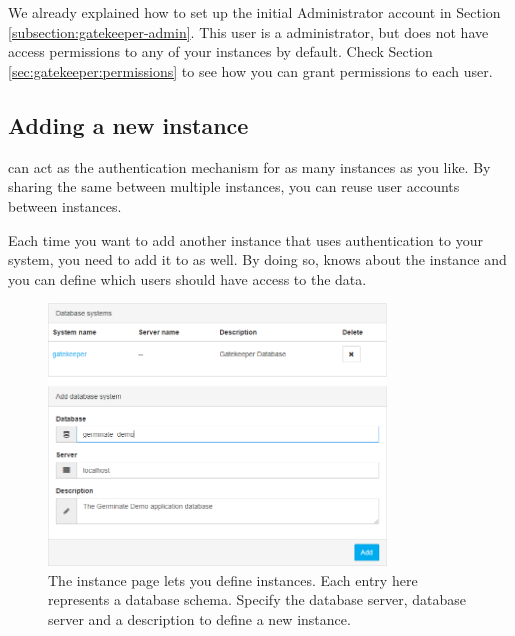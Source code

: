 \section{{\gatekeeper}}
\label{sec:gatekeeper}

We already explained how to set up the initial {\gatekeeper} Administrator account in Section \ref{subsection:gatekeeper-admin}. This user is a {\gatekeeper} administrator, but does not have access permissions to any of your {\germinate} instances by default. Check Section \ref{sec:gatekeeper:permissions} to see how you can grant permissions to each user.

\subsection{Adding a new {\germinate} instance}
{\gatekeeper} can act as the authentication mechanism for as many {\germinate} instances as you like. By sharing the same {\gatekeeper} between multiple {\germinate} instances, you can reuse user accounts between instances.

Each time you want to add another {\germinate} instance that uses authentication to your system, you need to add it to {\gatekeeper} as well. By doing so, {\gatekeeper} knows about the {\germinate} instance and you can define which users should have access to the data.

\begin{figure}
	\centering
	\includegraphics[width=0.8\textwidth]{img/gatekeeper/database-systems.png}
	\caption{The {\germinate} instance page lets you define {\germinate} instances. Each entry here represents a database schema. Specify the database server, database server and a description to define a new instance.}
	\label{fig:gatekeeper:instances}
\end{figure}

